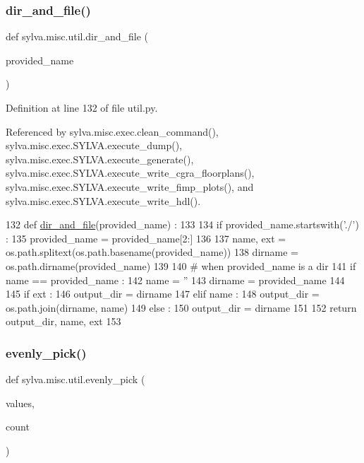 \subsubsection{\texorpdfstring{dir\+\_\+and\+\_\+file()}{dir\_and\_file()}}
{\footnotesize\ttfamily def sylva.\+misc.\+util.\+dir\+\_\+and\+\_\+file (\begin{DoxyParamCaption}\item[{}]{provided\+\_\+name }\end{DoxyParamCaption})}



Definition at line 132 of file util.\+py.



Referenced by sylva.\+misc.\+exec.\+clean\+\_\+command(), sylva.\+misc.\+exec.\+S\+Y\+L\+V\+A.\+execute\+\_\+dump(), sylva.\+misc.\+exec.\+S\+Y\+L\+V\+A.\+execute\+\_\+generate(), sylva.\+misc.\+exec.\+S\+Y\+L\+V\+A.\+execute\+\_\+write\+\_\+cgra\+\_\+floorplans(), sylva.\+misc.\+exec.\+S\+Y\+L\+V\+A.\+execute\+\_\+write\+\_\+fimp\+\_\+plots(), and sylva.\+misc.\+exec.\+S\+Y\+L\+V\+A.\+execute\+\_\+write\+\_\+hdl().


\begin{DoxyCode}
132 \textcolor{keyword}{def }\hyperlink{namespacesylva_1_1misc_1_1util_a0ce6d1d719234031353b60ac60f2af0d}{dir\_and\_file}(provided\_name) :
133 
134   \textcolor{keywordflow}{if} provided\_name.startswith(\textcolor{stringliteral}{'./'}) :
135     provided\_name = provided\_name[2:]
136 
137   name, ext = os.path.splitext(os.path.basename(provided\_name))
138   dirname = os.path.dirname(provided\_name)
139 
140   \textcolor{comment}{# when provided\_name is a dir}
141   \textcolor{keywordflow}{if} name == provided\_name :
142     name = \textcolor{stringliteral}{''}
143     dirname = provided\_name
144 
145   \textcolor{keywordflow}{if} ext :
146     output\_dir = dirname
147   \textcolor{keywordflow}{elif} name :
148     output\_dir = os.path.join(dirname, name)
149   \textcolor{keywordflow}{else} :
150     output\_dir = dirname
151 
152   \textcolor{keywordflow}{return} output\_dir, name, ext
153 
\end{DoxyCode}
\mbox{\label{namespacesylva_1_1misc_1_1util_a0881116abd7a50c6cd552b6b3edafea3}} 
\subsubsection{\texorpdfstring{evenly\+\_\+pick()}{evenly\_pick()}}
{\footnotesize\ttfamily def sylva.\+misc.\+util.\+evenly\+\_\+pick (\begin{DoxyParamCaption}\item[{}]{values,  }\item[{}]{count }\end{DoxyParamCaption})}



